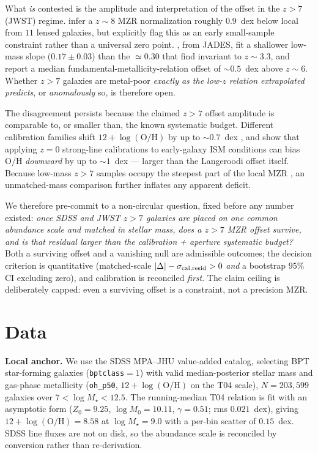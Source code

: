 \documentclass[twocolumn]{aastex631}
\begin{document}
What \emph{is} contested is the amplitude and interpretation of the offset in the $z>7$ (JWST) regime. \citet{Langeroodi2023} infer a $z\sim8$ MZR normalization roughly $0.9$~dex below local from $11$ lensed galaxies, but explicitly flag this as an early small-sample constraint rather than a universal zero point. \citet{Curti2024}, from JADES, fit a shallower low-mass slope ($0.17\pm0.03$) than the $\simeq0.30$ that \citet{Sanders2021} find invariant to $z\sim3.3$, and report a median fundamental-metallicity-relation offset of $\sim0.5$~dex above $z\sim6$. Whether $z>7$ galaxies are metal-poor \emph{exactly as the low-$z$ relation extrapolated predicts}, or \emph{anomalously} so, is therefore open.

The disagreement persists because the claimed $z>7$ offset amplitude is comparable to, or smaller than, the known systematic budget. Different calibration families shift $12+\log(\mathrm{O/H})$ by up to $\sim0.7$~dex \citep{KewleyEllison2008}, and \citet{Hirschmann2023} show that applying $z=0$ strong-line calibrations to early-galaxy ISM conditions can bias $\mathrm{O/H}$ \emph{downward} by up to $\sim1$~dex --- larger than the Langeroodi offset itself. Because low-mass $z>7$ samples occupy the steepest part of the local MZR \citep{Tremonti2004}, an unmatched-mass comparison further inflates any apparent deficit.

We therefore pre-commit to a non-circular question, fixed before any number existed: \emph{once SDSS and JWST $z>7$ galaxies are placed on one common abundance scale and matched in stellar mass, does a $z>7$ MZR offset survive, and is that residual larger than the calibration + aperture systematic budget?} Both a surviving offset and a vanishing null are admissible outcomes; the decision criterion is quantitative (matched-scale $|\Delta|-\sigma_{\rm cal,resid}>0$ \emph{and} a bootstrap $95\%$ CI excluding zero), and calibration is reconciled \emph{first}. The claim ceiling is deliberately capped: even a surviving offset is a constraint, not a precision MZR.

\section{Data}
\textbf{Local anchor.} We use the SDSS MPA--JHU value-added catalog, selecting BPT star-forming galaxies (\texttt{bptclass}$=1$) with valid median-posterior stellar mass and gas-phase metallicity (\texttt{oh\_p50}, $12+\log(\mathrm{O/H})$ on the T04 scale), $N=203{,}599$ galaxies over $7<\log M_\star<12.5$. The running-median T04 relation is fit with an asymptotic form ($Z_0=9.25$, $\log M_0=10.11$, $\gamma=0.51$; rms $0.021$~dex), giving $12+\log(\mathrm{O/H})=8.58$ at $\log M_\star=9.0$ with a per-bin scatter of $0.15$~dex. SDSS line fluxes are not on disk, so the abundance scale is reconciled by conversion rather than re-derivation.
\end{document}
